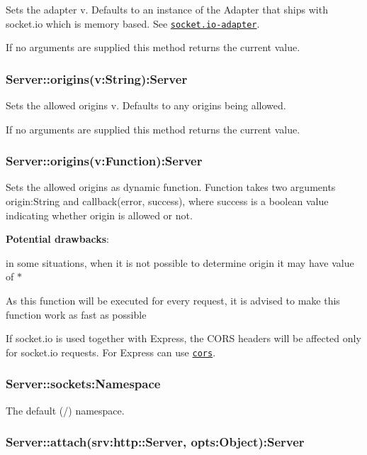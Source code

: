 Sets the adapter {\ttfamily v}. Defaults to an instance of the {\ttfamily Adapter} that ships with socket.\+io which is memory based. See \href{https://github.com/socketio/socket.io-adapter}{\tt socket.\+io-\/adapter}.

If no arguments are supplied this method returns the current value.

\subsubsection*{Server\+::origins(v\+:\+String)\+:Server}

Sets the allowed origins {\ttfamily v}. Defaults to any origins being allowed.

If no arguments are supplied this method returns the current value.

\subsubsection*{Server\+::origins(v\+:\+Function)\+:Server}

Sets the allowed origins as dynamic function. Function takes two arguments {\ttfamily origin\+:String} and {\ttfamily callback(error, success)}, where {\ttfamily success} is a boolean value indicating whether origin is allowed or not.

{\bfseries Potential drawbacks}\+:
\begin{DoxyItemize}
\item in some situations, when it is not possible to determine {\ttfamily origin} it may have value of {\ttfamily $\ast$}
\item As this function will be executed for every request, it is advised to make this function work as fast as possible
\item If {\ttfamily socket.\+io} is used together with {\ttfamily Express}, the C\+O\+RS headers will be affected only for {\ttfamily socket.\+io} requests. For Express can use \href{https://github.com/expressjs/cors}{\tt cors}.
\end{DoxyItemize}

\subsubsection*{Server\+::sockets\+:Namespace}

The default ({\ttfamily /}) namespace.

\subsubsection*{Server\+::attach(srv\+:http\+::\+Server, opts\+:Object)\+:Server}

